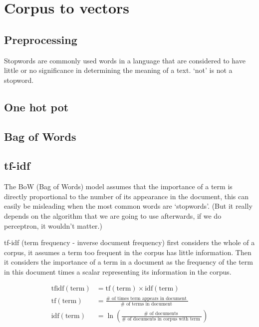 \documentclass{article}
\begin{document}
\tableofcontents

\section{Corpus to vectors}

\subsection{Preprocessing}

Stopwords are commonly used words in a language that are considered to have little or no significance in determining the meaning of a text.
`not' is not a stopword.

\subsection{One hot pot}

\subsection{Bag of Words}

\subsection{tf-idf}

The BoW (Bag of Words) model assumes that the importance of a term is directly proportional to
the number of its appearance in the document, this can easily be misleading
when the most common words are `stopwords'. (But it really depends on
the algorithm that we are going to use afterwards, if we do perceptron, it wouldn't matter.)

tf-idf (term frequency - inverse document frequency) first considers
the whole of a corpus, it assumes a term too frequent in the corpus has little
information. Then it considers the importance of a term in a document
as the frequency of the term in this document times a scalar
representing its information in the corpus.

$$
\begin{aligned}
\mathrm{tfidf}(\mathrm{term}) & = \mathrm{tf}(\mathrm{term}) \times \mathrm{idf}(\mathrm{term}) \\
\mathrm{tf}(\mathrm{term}) & = \frac{\# \text { of times term appears in document }}{\# \text { of terms in document }} \\
\mathrm{idf}(\mathrm{term}) & =\ln \left(\frac{\# \text { of documents }}{\# \text { of documents in corpus with term }}\right)
\end{aligned}
$$
\end{document}
